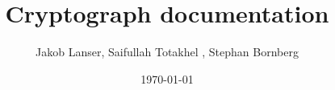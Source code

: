 \documentclass[10pt,german]{article}
\begin{document}
\title{Cryptograph documentation}
\author{Jakob Lanser, Saifullah Totakhel , Stephan Bornberg}
\date{\today}
\maketitle
\end{document}
